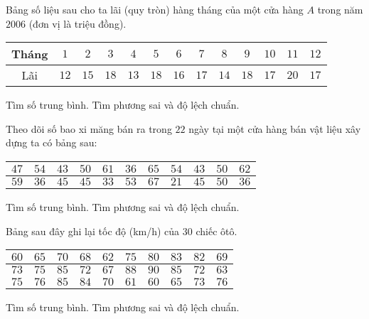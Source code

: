 \begin{bt}%
	Bảng số liệu sau cho ta lãi (quy tròn) hàng tháng của một cửa hàng $A$ trong năm $2006$ (đơn vị là triệu đồng).
	\begin{center}
		\begin{tabular}{|c|c|c|c|c|c|c|c|c|c|c|c|c|}
			\hline 
			Tháng & $1$ & $2$ & $3$ & $4$ & $5$ & $6$ & $7$ & $8$ & $9$ & $10$ & $11$ & $12$ \\ 
			\hline 
			Lãi & $12$ & $15$ & $18$ & $13$ & $18$ & $16$ & $17$ & $14$ & $18$ & $17$ & $20$ & $17$ \\ 
			\hline 
		\end{tabular} 
	\end{center}
	Tìm số  trung bình. Tìm phương sai và độ lệch chuẩn.
\end{bt}

\begin{bt}%
	Theo dõi số bao xi măng bán ra trong $22$ ngày tại một cửa hàng bán vật liệu xây dựng ta có bảng sau:
	\begin{center}
		\begin{tabular}{|c|c|c|c|c|c|c|c|c|c|c|}
			\hline 
			$47$ & $54$ & $43$ & $50$ & $61$ & $36$ & $65$ & $54$ & $43$ & $50$ & $62$ \\ 
			\hline 
			$59$ & $36$ & $45$ & $45$ & $33$ & $53$ & $67$ & $21$ & $45$ & $50$ & $36$ \\ 
			\hline 
		\end{tabular} 
	\end{center}
	Tìm số trung bình. Tìm phương sai và độ lệch chuẩn.
\end{bt}

\begin{bt}%
	Bảng sau đây ghi lại tốc độ (km/h) của $30$ chiếc ôtô.
	\begin{center}
		\begin{tabular}{|c|c|c|c|c|c|c|c|c|c|}
			\hline 
			$60$ & $65$ & $70$ & $68$ & $62$ & $75$ & $80$ & $83$& $82 $& $69$ \\ 
			\hline 
			$73$ & $75$ & $85$ & $72$ & $67$ & $88$ & $90$ & $85$ & $72$ & $63$ \\ 
			\hline 
			$75$ & $76$ & $85$ & $84$ & $70$ & $61$ & $60$ & $65$ & $73$ & $76$ \\ 
			\hline 
		\end{tabular} 
	\end{center}
	Tìm số trung bình. Tìm phương sai và độ lệch chuẩn.
\end{bt}


